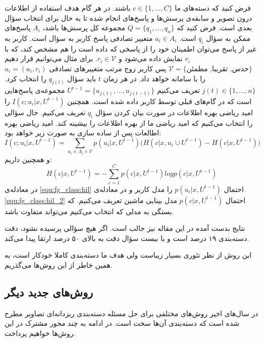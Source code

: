 \documentclass[11pt]{article}
\begin{document}
فرض کنید که دسته‌های ما
$c \in \{1, ..., C\}$ باشند.
در هر گام هدف استفاده از اطلاعات درون تصویر و سابقه‌ی پرسش‌ها و پاسخ‌های انجام شده تا به حال برای انتخاب سؤال بعدی است.
فرض کنید که
$Q = \{q_1, ..., q_n\}$
 مجموعه کل پرسش‌ها باشد،
$A_i$ پاسخ‌های ممکن به سؤال
$q_i$ است.
$a_i \in A_i$
متغییر تصادفی پاسخ کاربر به سؤال است. کاربر به غیر از پاسخ می‌توان اطمینان خود را از پاسخی که داده است را هم مشخص کند، که با
$r_i$ نمایش داده می‌شود و
$r_i \in \mathcal{V}$. برای مثال می‌توانیم قرار دهیم
$\mathcal{V} = \{ \text{حدس, تقریبا, مطمئن} \}$
پس کاربر زوج مرتب متغییر‌های تصادفی
$u_i = ( a_i, r_i )$
را با سامانه خواهد داد.
در هر زمان $t$ باید سؤال
$q_{j(t)}$ را انتخاب کرد.
$j(t) \in \{ 1, ..., n \} $
تعریف می‌کنیم
$ U^{t-1} = \{ u_{j(1)}, ..., u_{j(t-1)} \} $
مجموعه‌ی پاسخ‌هایی است که در گام‌های قبلی توسط کاربر داده شده است.
همچنین
$I(c; u_i | x, U^{t-1})$ را امید ریاضی بهره اطلاعات در صورت بیان کردن سؤال
$q_i$ تعریف می‌کنیم.
حال سؤالی را انتخاب می‌کنیم که امید ریاضی ما از بهره اطلاعات را بیشینه کند. امید ریاضی بهره اطالعات پس از ساده‌ سازی به صورت زیر خواهد بود:
\begin{equation}
	\label{equ:fg_class:hil}
	I(c; u_i | x, U^{t-1}) = \sum_{u_i \in A_i \times \mathcal{V}} p(u_i | x, U ^{t-1}) \bigg( H(c| x, u_i \cup U ^{t-1}) - H( c | x, U ^{t-1} ) \bigg)
\end{equation}
و همچنین داریم:
\begin{equation}
	\label{equ:fg_class:hil_2}
	H( c | x, U ^{t-1} ) = - \sum_{c=1}^{C} p(c|x, U ^{t-1}) log p(c|x, U ^{t-1})
\end{equation}
در معادله‌ی
\ref{equ:fg_class:hil}
احتمال
$p(u_i | x, U ^{t-1})$
را مدل کاربر و در معادله‌ی
\ref{equ:fg_class:hil_2}
احتمال
$p(c|x, U ^{t-1})$
مدل بینایی ماشین تعریف می‌کنیم. که بستگی به مدلی که انتخاب می‌کنیم می‌تواند متفاوت باشد.

نتایج بدست آمده در این
\cite{branson2010}
مقاله نیز جالب است.
اگر هیچ سؤالی پرسیده نشود، دقت دسته‌بندی ۱۹ درصد است و با بیست سؤال دقت به بالای ۵۰ درصد ارتقا پیدا می‌کند.

این روش از نظر تئوری بسیار زیباست ولی هدف ما دسته‌بندی کاملا خودکار است، به همین خاطر از این روش‌ها می‌گذریم.

\subsection{روش‌های جدید دیگر}\label{sec:fg_class:new}
در سال‌های اخیر روش‌های مختلفی برای حل مسئله دسته‌بندی ریزدانه‌ای تصاویر مطرح شده است که دسته‌بندی آن‌ها سخت است. در ادامه به چند محور مشترک در این روش‌ها خواهیم پرداخت.
\end{document}
